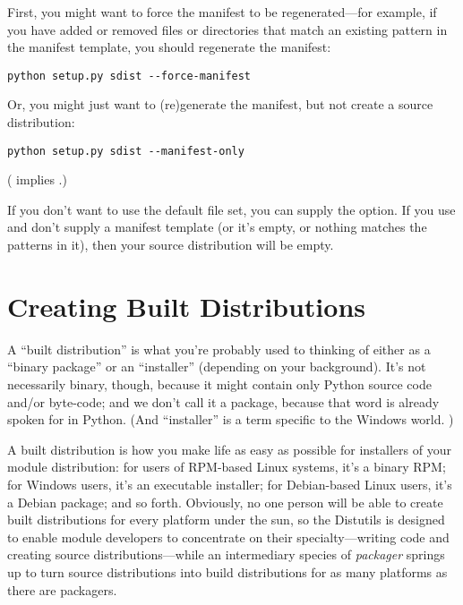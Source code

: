 \documentclass{howto}
\begin{document}
First, you might want to force the manifest to be regenerated---for
example, if you have added or removed files or directories that match an
existing pattern in the manifest template, you should regenerate the
manifest:
\begin{verbatim}
python setup.py sdist --force-manifest
\end{verbatim}

Or, you might just want to (re)generate the manifest, but not create a
source distribution:
\begin{verbatim}
python setup.py sdist --manifest-only
\end{verbatim}
( implies .)

If you don't want to use the default file set, you can supply the
 option.  If you use
 and don't supply a manifest template (or
it's empty, or nothing matches the patterns in it), then your source
distribution will be empty.


\section{Creating Built Distributions}
\label{sec:built-dist}

A ``built distribution'' is what you're probably used to thinking of
either as a ``binary package'' or an ``installer'' (depending on your
background).  It's not necessarily binary, though, because it might
contain only Python source code and/or byte-code; and we don't call it a
package, because that word is already spoken for in Python.  (And
``installer'' is a term specific to the Windows world.  )

A built distribution is how you make life as easy as possible for
installers of your module distribution: for users of RPM-based Linux
systems, it's a binary RPM; for Windows users, it's an executable
installer; for Debian-based Linux users, it's a Debian package; and so
forth.  Obviously, no one person will be able to create built
distributions for every platform under the sun, so the Distutils is
designed to enable module developers to concentrate on their
specialty---writing code and creating source distributions---while an
intermediary species of \emph{packager} springs up to turn source
distributions into build distributions for as many platforms as there
are packagers.
\end{document}
